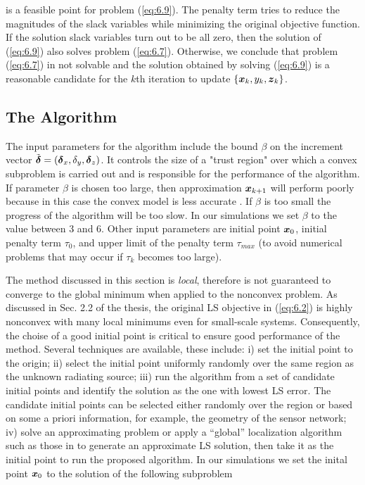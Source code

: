 \noindent
is a feasible point for problem (\ref{eq:6.9}). The penalty term tries to reduce the magnitudes of the slack variables while minimizing the original objective function. If the solution slack variables turn out to be all zero, then the solution  of (\ref{eq:6.9}) also solves problem (\ref{eq:6.7}). Otherwise, we conclude that problem (\ref{eq:6.7}) in not solvable and the solution obtained by solving (\ref{eq:6.9}) is a reasonable candidate for the $k$th iteration to update $\{\mbox{\boldmath$x$}_k, y_k, \mbox{\boldmath$z$}_k\}$.

\subsection{The Algorithm}

The input parameters for the algorithm include the bound $\beta$ on the increment vector $\tilde{\mbox{\boldmath${\delta}$}} =\left(
\mbox{\boldmath${\delta}$}_x, \delta_y, \mbox{\boldmath${\delta}$}_z\right)$. It controls the size of a "trust region" over which a convex subproblem is carried out and is responsible for the performance of the algorithm. If parameter $\beta$ is chosen too large, then approximation $\mbox{\boldmath$x$}_{k+1}$ will perform poorly because in this case the convex model is less accurate \cite{OPTII}. If $\beta$ is too small the progress of the algorithm will be too slow. In our simulations we set  $\beta$ to the value between 3 and 6. Other input parameters are initial point $\mbox{\boldmath$x$}_0$, initial penalty term $\tau_0$, and upper limit of the penalty term $\tau_{max}$ (to avoid numerical problems that may occur  if $\tau_k$ becomes too large).

The method discussed in this section is \textit{local}, therefore is not guaranteed to converge to the global minimum when applied to the nonconvex problem. As discussed in Sec. 2.2 of the thesis, the original LS objective in (\ref{eq:6.2}) is highly nonconvex with many local minimums even for small-scale systems. Consequently, the choise of a good initial point is critical to ensure good performance of the method. Several techniques are available, these include: i) set the initial point to the origin; ii) select the initial point uniformly randomly over the same region as the unknown radiating source; iii) run the algorithm from a set of candidate initial points and identify the solution as the one with lowest LS error.  The candidate initial points can be selected either randomly over the region or based on some  a priori information, for example, the geometry of the sensor network; iv) solve an approximating problem or apply a “global” localization algorithm such as those in \cite{BeckStLi} to generate an approximate LS solution, then take it as the initial point to run the proposed algorithm. 
In our simulations we set the inital point $\mbox{\boldmath$x$}_0$ to the solution of the following subproblem

